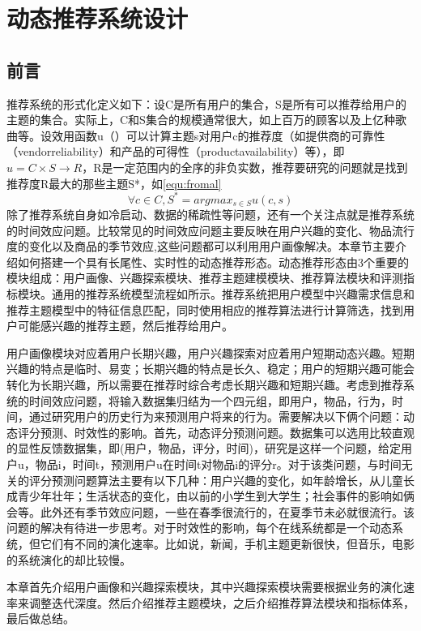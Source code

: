 
\chapter{动态推荐系统设计}
  \section{前言}
  推荐系统的形式化定义如下：设C是所有用户的集合，S是所有可以推荐给用户的主题的集合。实际上，C和S集合的规模通常很大，如上百万的顾客以及上亿种歌曲等。设效用函数u（）可以计算主题s对用户c的推荐度（如提供商的可靠性（vendorreliability）和产品的可得性（productavailability）等），即$u=C\times S \rightarrow R$，R是一定范围内的全序的非负实数，推荐要研究的问题就是找到推荐度R最大的那些主题S*，如\autoref{equ:fromal}
    \begin{equation}
    \forall c \in C,S^{*}=arg  max_{s \in S} u(c,s)
    \label{equ:fromal}
    \end{equation}
  除了推荐系统自身如冷启动、数据的稀疏性等问题，还有一个关注点就是推荐系统的时间效应问题。比较常见的时间效应问题主要反映在用户兴趣的变化、物品流行度的变化以及商品的季节效应,这些问题都可以利用用户画像解决。本章节主要介绍如何搭建一个具有长尾性、实时性的动态推荐形态。动态推荐形态由3个重要的模块组成：用户画像、兴趣探索模块、推荐主题建模模块、推荐算法模块和评测指标模块。通用的推荐系统模型流程如所示。推荐系统把用户模型中兴趣需求信息和推荐主题模型中的特征信息匹配，同时使用相应的推荐算法进行计算筛选，找到用户可能感兴趣的推荐主题，然后推荐给用户。

  用户画像模块对应着用户长期兴趣，用户兴趣探索对应着用户短期动态兴趣。短期兴趣的特点是临时、易变；长期兴趣的特点是长久、稳定；用户的短期兴趣可能会转化为长期兴趣，所以需要在推荐时综合考虑长期兴趣和短期兴趣。考虑到推荐系统的时间效应问题，将输入数据集归结为一个四元组，即{用户，物品，行为，时间}，通过研究用户的历史行为来预测用户将来的行为。需要解决以下俩个问题：动态评分预测、时效性的影响。首先，动态评分预测问题。数据集可以选用比较直观的显性反馈数据集，即(用户，物品，评分，时间)，研究是这样一个问题，给定用户u，物品i，时间t，预测用户u在时间t对物品i的评分r。对于该类问题，与时间无关的评分预测问题算法主要有以下几种：用户兴趣的变化，如年龄增长，从儿童长成青少年壮年；生活状态的变化，由以前的小学生到大学生；社会事件的影响如俩会等。此外还有季节效应问题，一些在春季很流行的，在夏季节未必就很流行。该问题的解决有待进一步思考。对于时效性的影响，每个在线系统都是一个动态系统，但它们有不同的演化速率。比如说，新闻，手机主题更新很快，但音乐，电影的系统演化的却比较慢。

  本章首先介绍用户画像和兴趣探索模块，其中兴趣探索模块需要根据业务的演化速率来调整迭代深度。然后介绍推荐主题模块，之后介绍推荐算法模块和指标体系，最后做总结。
  

